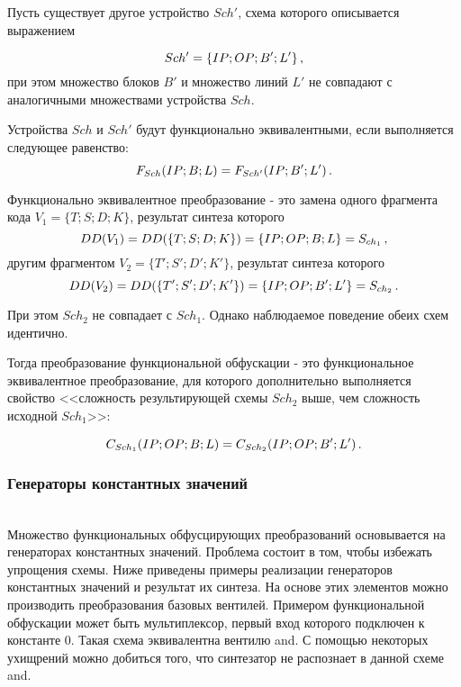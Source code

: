 Пусть существует другое устройство $Sch'$, схема которого описывается выражением

\begin{equation}
  Sch' = \{IP;OP;B';L'\} \text{\,,}
  \label{eq:domain:lexical:schema}
\end{equation}
при этом множество блоков $B'$ и множество линий $L'$ не совпадают с аналогичными множествами устройства $Sch$.

Устройства $Sch$ и $Sch'$ будут функционально эквивалентными, если выполняется следующее равенство\cite{ivaniuk}:
\begin{equation}
  F_{Sch}(IP;B;L) = F_{Sch'}(IP;B';L') \text{\,.}
  \label{eq:domain:functional:basis}
\end{equation}

Функционально эквивалентное преобразование - это замена одного фрагмента кода $V_1 = \{T;S;D;K\}$, результат синтеза которого
\begin{equation}
  DD(V_1) = DD(\{T;S;D;K\}) = \{IP;OP;B;L\} = S_{ch_1} \text{\,,}
  \label{eq:domain:functional:schema}
\end{equation}
другим фрагментом $V_2 = \{T';S';D';K'\}$, результат синтеза которого
\begin{equation}
  DD(V_2) = DD(\{T';S';D';K'\}) = \{IP;OP;B';L'\} = S_{ch_2} \text{\,.}
  \label{eq:domain:functional:schema}
\end{equation}

При этом $Sch_2$ не совпадает с $Sch_1$. Однако наблюдаемое поведение \cite{collberg} обеих схем идентично.

Тогда преобразование функциональной обфускации - это функциональное эквивалентное преобразование, для которого дополнительно выполняется свойство <<сложность результирующей схемы $Sch_2$ выше, чем сложность исходной $Sch_1$>>:

\begin{equation}
  C_{Sch_1}(IP;OP;B;L) = C_{Sch_2}(IP;OP;B';L') \text{\,.}
  \label{eq:domain:functional:schema}
\end{equation}

\subsubsection{Генераторы константных значений}~\\

Множество функциональных обфусцирующих преобразований основывается на генераторах константных значений. Проблема состоит в том, чтобы избежать упрощения схемы. Ниже приведены примеры реализации генераторов константных значений и результат их синтеза. На основе этих элементов можно производить преобразования базовых вентилей. Примером функциональной обфускации может быть мультиплексор, первый вход которого подключен к константе 0. Такая схема эквивалентна вентилю and. С помощью некоторых ухищрений можно добиться того, что синтезатор не распознает в данной схеме and.


